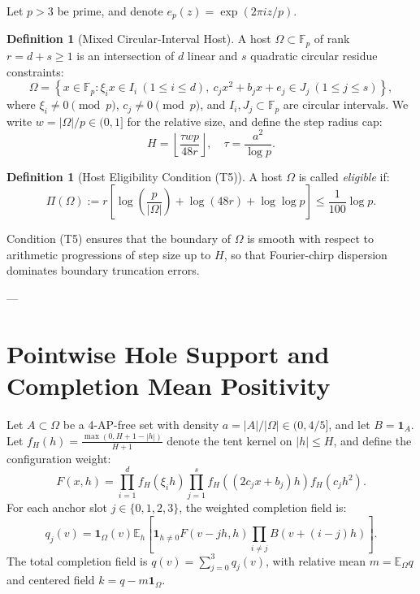 \documentclass[11pt,reqno]{amsart}
\theoremstyle{plain}
\theoremstyle{definition}
\newtheorem{definition}[theorem]{Definition}
\newcommand{\F}{\mathbb{F}}
\newcommand{\E}{\mathbb{E}}
\newcommand{\one}{\mathbf{1}}
\begin{document}
Let $p > 3$ be prime, and denote $e_p(z) = \exp(2\pi i z / p)$.

\begin{definition}[Mixed Circular-Interval Host]
A host $\Omega \subset \F_p$ of rank $r = d + s \ge 1$ is an intersection of $d$ linear and $s$ quadratic circular residue constraints:
\begin{equation}
\Omega = \left\{ x \in \F_p : \xi_i x \in I_i \ (1 \le i \le d), \ c_j x^2 + b_j x + e_j \in J_j \ (1 \le j \le s) \right\},
\end{equation}
where $\xi_i \ne 0 \pmod p$, $c_j \ne 0 \pmod p$, and $I_i, J_j \subset \F_p$ are circular intervals.
We write $w = |\Omega| / p \in (0, 1]$ for the relative size, and define the step radius cap:
\begin{equation}
H = \left\lfloor \frac{\tau w p}{48 r} \right\rfloor, \quad \tau = \frac{a^2}{\log p}.
\end{equation}
\end{definition}

\begin{definition}[Host Eligibility Condition (T5)]
A host $\Omega$ is called \emph{eligible} if:
\begin{equation}
\Pi(\Omega) := r \left[ \log\left( \frac{p}{|\Omega|} \right) + \log(48r) + \log\log p \right] \le \frac{1}{100} \log p. \tag{T5}
\end{equation}
\end{definition}

Condition (T5) ensures that the boundary of $\Omega$ is smooth with respect to arithmetic progressions of step size up to $H$, so that Fourier-chirp dispersion dominates boundary truncation errors.

---

\section{Pointwise Hole Support and Completion Mean Positivity}

Let $A \subset \Omega$ be a 4-AP-free set with density $a = |A| / |\Omega| \in (0, 4/5]$, and let $B = \one_A$.
Let $f_H(h) = \frac{\max(0, H + 1 - |h|)}{H + 1}$ denote the tent kernel on $|h| \le H$, and define the configuration weight:
\begin{equation}
F(x, h) = \prod_{i=1}^d f_H(\xi_i h) \prod_{j=1}^s f_H((2c_j x + b_j)h) f_H(c_j h^2).
\end{equation}
For each anchor slot $j \in \{0, 1, 2, 3\}$, the weighted completion field is:
\begin{equation}
q_j(v) = \one_\Omega(v) \E_h \left[ \one_{h \ne 0} F(v - jh, h) \prod_{i \ne j} B(v + (i - j)h) \right].
\end{equation}
The total completion field is $q(v) = \sum_{j=0}^3 q_j(v)$, with relative mean $m = \E_\Omega q$ and centered field $k = q - m \one_\Omega$.
\end{document}
